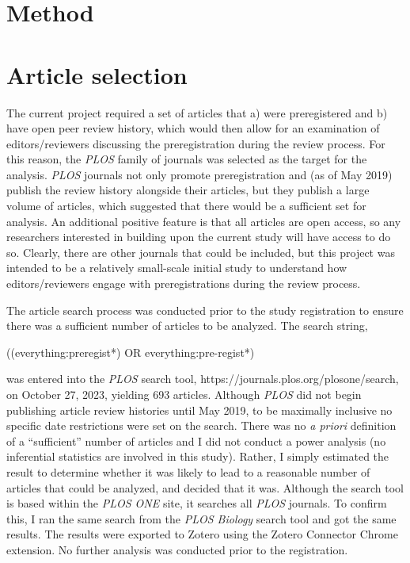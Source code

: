 \documentclass[authordate, empirical]{jote-new-article}
\begin{document}
	\section{\textbf{Method}}



	\section{\textbf{Article selection}}



	The current project required a set of articles that a) were preregistered and b) have open peer review history, which would then allow for an examination of editors/reviewers discussing the preregistration during the review process. For this reason, the \emph{PLOS} family of journals was selected as the target for the analysis. \emph{PLOS} journals not only promote preregistration and (as of May 2019) publish the review history alongside their articles, but they publish a large volume of articles, which suggested that there would be a sufficient set for analysis. An additional positive feature is that all articles are open access, so any researchers interested in building upon the current study will have access to do so. Clearly, there are other journals that could be included, but this project was intended to be a relatively small-scale initial study to understand how editors/reviewers engage with preregistrations during the review process.



	The article search process was conducted prior to the study registration to ensure there was a sufficient number of articles to be analyzed. The search string,



	((everything:preregist*) OR everything:pre-regist*)



	was entered into the \emph{PLOS} search tool, https://journals.plos.org/plosone/search, on October 27, 2023, yielding 693 articles. Although \emph{PLOS} did not begin publishing article review histories until May 2019, to be maximally inclusive no specific date restrictions were set on the search. There was no \emph{a priori} definition of a “sufficient” number of articles and I did not conduct a power analysis (no inferential statistics are involved in this study). Rather, I simply estimated the result to determine whether it was likely to lead to a reasonable number of articles that could be analyzed, and decided that it was. Although the search tool is based within the \emph{PLOS ONE} site, it searches all \emph{PLOS} journals. To confirm this, I ran the same search from the \emph{PLOS Biology} search tool and got the same results. The results were exported to Zotero using the Zotero Connector Chrome extension. No further analysis was conducted prior to the registration.
\end{document}
